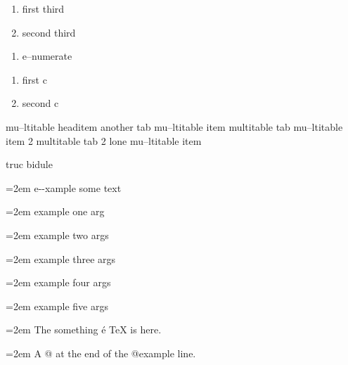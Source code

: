 \documentclass{book}
\begin{document}
\begin{enumerate}[start=3]
\item first third
\item second third
\end{enumerate}

\begin{enumerate}[label=\alph*.]
\item e--numerate
\end{enumerate}

\begin{enumerate}[label=\alph*.,start=3]
\item first c
\item second c
\end{enumerate}

mu--ltitable headitem another tab
mu--ltitable item multitable tab
mu--ltitable item 2 multitable tab 2
%
lone mu--ltitable item

truc bidule

\par\begingroup\obeylines\obeyspaces\frenchspacing\leftskip=2em\relax\parskip=0pt\relax\ttfamily{}%
e{-}{-}xample  some
   text
\endgroup{}%

\par\begingroup\obeylines\obeyspaces\frenchspacing\leftskip=2em\relax\parskip=0pt\relax\ttfamily{}%
example one arg
\endgroup{}%

\par\begingroup\obeylines\obeyspaces\frenchspacing\leftskip=2em\relax\parskip=0pt\relax\ttfamily{}%
example two args
\endgroup{}%

\par\begingroup\obeylines\obeyspaces\frenchspacing\leftskip=2em\relax\parskip=0pt\relax\ttfamily{}%
example three args
\endgroup{}%

\par\begingroup\obeylines\obeyspaces\frenchspacing\leftskip=2em\relax\parskip=0pt\relax\ttfamily{}%
example four args
\endgroup{}%

\par\begingroup\obeylines\obeyspaces\frenchspacing\leftskip=2em\relax\parskip=0pt\relax\ttfamily{}%
example five args
\endgroup{}%

\par\begingroup\obeylines\obeyspaces\frenchspacing\leftskip=2em\relax\parskip=0pt\relax\ttfamily{}%
The something \'{e} \TeX{} is here.
\endgroup{}%

\par\begingroup\obeylines\obeyspaces\frenchspacing\leftskip=2em\relax\parskip=0pt\relax\ttfamily{}%
A @ at the end of the @example line.
\endgroup{}%
\end{document}
